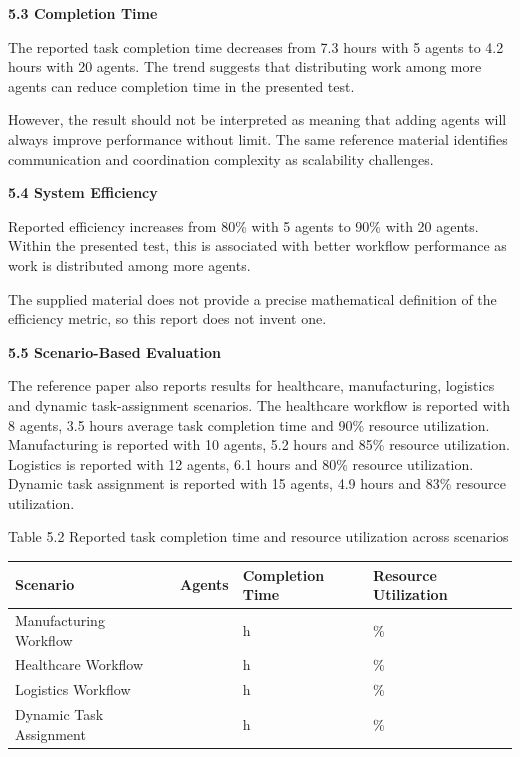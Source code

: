 \documentclass[12pt,letterpaper]{article}
\newcommand{\sectiontitle}[1]{%
  \vspace{6pt}%
  {\noindent\fontsize{13.2pt}{16pt}\selectfont\bfseries #1\par}%
  \vspace{2pt}%
}
\newcommand{\tablecaption}[1]{%
  \begin{center}
    {\fontsize{10.4pt}{12pt}\selectfont #1\par}%
  \end{center}%
  \vspace{2pt}%
}
\newcommand{\bodytextstyle}{\fontsize{11.3pt}{25.8pt}\selectfont}
\begin{document}
\bodytextstyle
\sectiontitle{5.3 Completion Time}
The reported task completion time decreases from 7.3 hours with 5 agents to 4.2 hours with 20 agents. The trend suggests that distributing work among more agents can reduce completion time in the presented test.

However, the result should not be interpreted as meaning that adding agents will always improve performance without limit. The same reference material identifies communication and coordination complexity as scalability challenges.
\newpage

\bodytextstyle
\sectiontitle{5.4 System Efficiency}
Reported efficiency increases from 80\% with 5 agents to 90\% with 20 agents. Within the presented test, this is associated with better workflow performance as work is distributed among more agents.

The supplied material does not provide a precise mathematical definition of the efficiency metric, so this report does not invent one.

\sectiontitle{5.5 Scenario-Based Evaluation}
The reference paper also reports results for healthcare, manufacturing, logistics and dynamic task-assignment scenarios. The healthcare workflow is reported with 8 agents, 3.5 hours average task completion time and 90\% resource utilization. Manufacturing is reported with 10 agents, 5.2 hours and 85\% resource utilization. Logistics is reported with 12 agents, 6.1 hours and 80\% resource utilization. Dynamic task assignment is reported with 15 agents, 4.9 hours and 83\% resource utilization.

\tablecaption{Table 5.2 Reported task completion time and resource utilization across scenarios}
\fontsize{8pt}{10.5pt}\selectfont
\noindent\begin{tabularx}{\linewidth}{|>{\arraybackslash}p{4.2cm}|>{\centering\arraybackslash}p{2.2cm}|>{\centering\arraybackslash}p{3.2cm}|>{\centering\arraybackslash}X|}
\hline
\rowcolor{tableheader}
\textbf{Scenario} & \textbf{Agents} & \textbf{Completion Time} & \textbf{Resource Utilization} \\
\hline
Manufacturing Workflow & 10 & 5.2 h & 85\% \\
\hline
Healthcare Workflow & 8 & 3.5 h & 90\% \\
\hline
Logistics Workflow & 12 & 6.1 h & 80\% \\
\hline
Dynamic Task Assignment & 15 & 4.9 h & 83\% \\
\hline
\end{tabularx}
\vspace{2pt}
\end{document}
